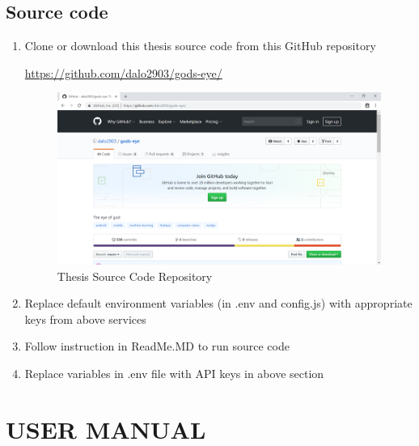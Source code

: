 \section{Source code}
\begin{enumerate}
\item Clone or download this thesis source code from this GitHub repository 

\href{https://github.com/dalo2903/gods-eye/}{https://github.com/dalo2903/gods-eye/}
\begin{center}
    \begin{figure}[H]
    \centering
    \includegraphics[width=1\columnwidth]{images/appendixA/GodsEye-GitHub.PNG}
    \caption{Thesis Source Code Repository}
    \end{figure}
\end{center}
\vspace{-1cm}
\item Replace default environment variables (in .env and config.js) with appropriate keys from above services
\item Follow instruction in ReadMe.MD to run source code
\item Replace variables in .env file with API keys in above section
\end{enumerate}

\chapter{USER MANUAL}
